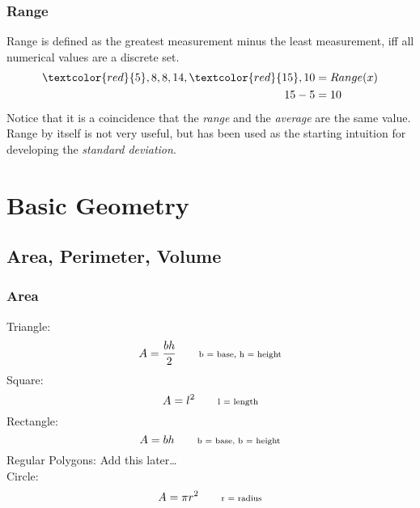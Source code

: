    \subsection{Range}
Range is defined as the greatest measurement minus the least measurement, iff all numerical values are a discrete set. 
\begin{align}
    \textcolor{red}{5}, 8, 8, 14, \textcolor{red}{15}, 10 &= Range(x)\\
15 - 5 &= 10
\end{align}
Notice that it is a coincidence that the {\sl range} and the {\sl average} are the same value. Range by itself is not very useful, but has been used as the starting intuition for developing the \textsl{standard deviation}.





\chapter{Basic Geometry}
      \section{Area, Perimeter, Volume}
   \subsection{Area}
Triangle:
\begin{equation}
    A = \frac{bh}{2} \qquad \text{\scriptsize b = base, h = height}
\end{equation}
Square:
\begin{equation}
    A = l^2 \qquad \text{\scriptsize l = length}
\end{equation}
Rectangle:
\begin{equation}
    A = bh \qquad \text{\scriptsize b = base, b = height}
\end{equation}
Regular Polygons:
Add this later\ldots\\
Circle:
\begin{equation}
    A = \pi r^2 \qquad \text{\scriptsize r = radius}
\end{equation}

